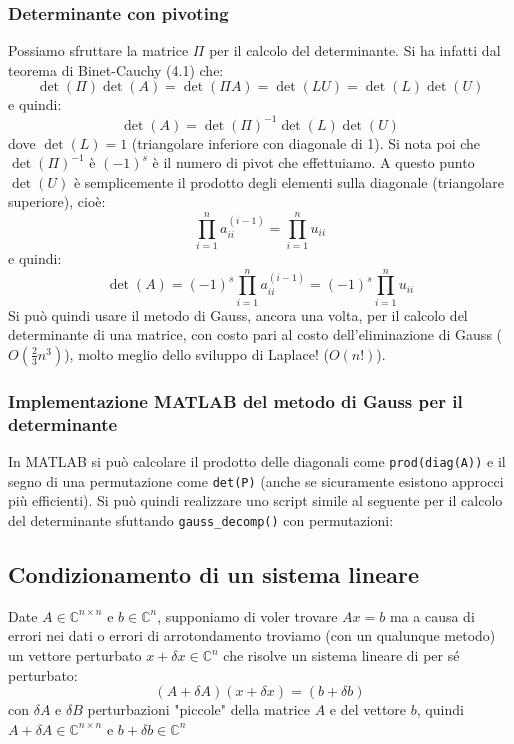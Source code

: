 \documentclass[a4paper,11pt]{article}
\begin{document}
\subsubsection{Determinante con pivoting}
Possiamo sfruttare la matrice $\Pi$ per il calcolo del determinante.
Si ha infatti dal teorema di Binet-Cauchy (4.1) che:
$$
\det(\Pi) \det(A) = \det(\Pi A) = \det(L U) = \det(L) \det(U)
$$
e quindi:
$$
\det(A) = \det(\Pi)^{-1} \det(L) \det(U)
$$
dove $\det(L) = 1$ (triangolare inferiore con diagonale di 1).
Si nota poi che $\det(\Pi)^{-1}$ è $(-1)^s$ è il numero di pivot che effettuiamo.
A questo punto $\det(U)$ è semplicemente il prodotto degli elementi sulla diagonale (triangolare superiore), cioè:
$$
\prod_{i = 1}^n a_{ii}^{(i - 1)} = \prod_{i = 1}^n u_{ii}
$$
e quindi:
$$
\det(A) = (-1)^s \prod_{i = 1}^n a_{ii}^{(i - 1)} = (-1)^s \prod_{i = 1}^n u_{ii}
$$
Si può quindi usare il metodo di Gauss, ancora una volta, per il calcolo del determinante di una matrice, con costo pari al costo dell'eliminazione di Gauss ($O(\frac{2}{3}n^3)$), molto meglio dello sviluppo di Laplace! ($O(n!)$).

\subsubsection{Implementazione MATLAB del metodo di Gauss per il determinante}
In MATLAB si può calcolare il prodotto delle diagonali come \lstinline|prod(diag(A))| e il segno di una permutazione come \lstinline|det(P)| (anche se sicuramente esistono approcci più efficienti).
Si può quindi realizzare uno script simile al seguente per il calcolo del determinante sfuttando \lstinline|gauss_decomp()| con permutazioni:


\subsection{Condizionamento di un sistema lineare}
Date $A \in \mathbb{C}^{n \times n}$ e $b \in \mathbb{C}^n$, supponiamo di voler trovare $Ax = b$ ma a causa di errori nei dati o errori di arrotondamento troviamo (con un qualunque metodo) un vettore perturbato $x + \delta x \in \mathbb{C}^n$ che risolve un sistema lineare di per sé perturbato:
$$
(A + \delta A) (x + \delta x) = (b + \delta b)
$$
con $\delta A$ e $\delta B$ perturbazioni "piccole" della matrice $A$ e del vettore $b$, quindi $A + \delta A \in \mathbb{C}^{n \times n}$ e $b + \delta b \in \mathbb{C}^n$
\end{document}
